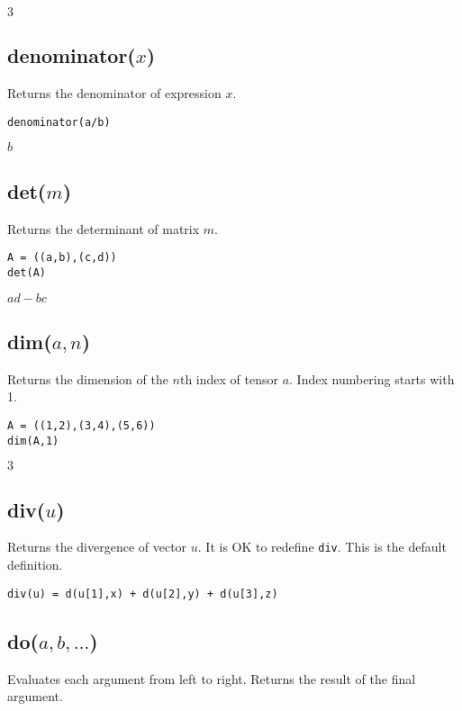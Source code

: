 \noindent
$3$

\subsection*{denominator($x$)}

Returns the denominator of expression $x$.

{\color{blue}
\begin{verbatim}
denominator(a/b)
\end{verbatim}
}

\noindent
$b$

\subsection*{det($m$)}

Returns the determinant of matrix $m$.

{\color{blue}
\begin{verbatim}
A = ((a,b),(c,d))
det(A)
\end{verbatim}
}

\noindent
$a d - b c$

\subsection*{dim($a,n$)}

Returns the dimension of the $n$th index of tensor $a$.
Index numbering starts with 1.

{\color{blue}
\begin{verbatim}
A = ((1,2),(3,4),(5,6))
dim(A,1)
\end{verbatim}
}

\noindent
$3$

\subsection*{div($u$)}

Returns the divergence of vector $u$.
It is OK to redefine {\tt div}.
This is the default definition.

{\color{blue}
\begin{verbatim}
div(u) = d(u[1],x) + d(u[2],y) + d(u[3],z)
\end{verbatim}
}

\subsection*{do($a,b,\ldots$)}

Evaluates each argument from left to right.
Returns the result of the final argument.

